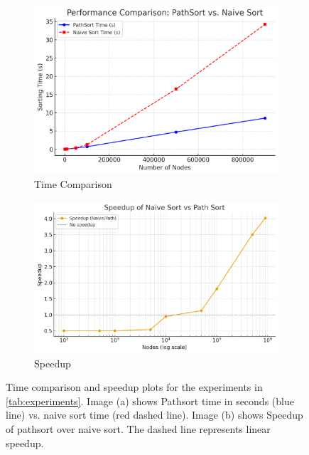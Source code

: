 \begin{figure}[H]
    \centering
    \begin{subfigure}[b]{0.48\textwidth}
        \centering
        \includegraphics[width=\textwidth]{"Immagini/plottime.png"}
        \caption{Time Comparison}
        \label{fig:time_comparison}
    \end{subfigure}
    \hfill %
    \begin{subfigure}[b]{0.48\textwidth}
        \centering
        \includegraphics[width=\textwidth]{"Immagini/speedup_pathsort.png"}
        \caption{Speedup}
        \label{fig:speedup}
    \end{subfigure}
    \caption{Time comparison and speedup plots for the experiments in \cref{tab:experiments}. Image (a) shows Pathsort time in seconds (blue line) vs. naive sort time (red dashed line). Image (b) shows Speedup of pathsort over naive sort. The dashed line represents linear speedup.}
    \label{fig:side_by_side_plots}
\end{figure}

